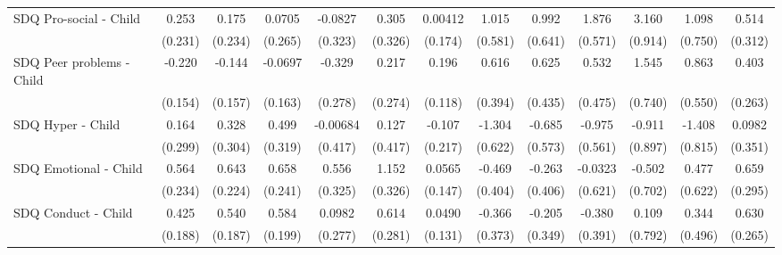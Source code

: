 {\begin{tabular}{l*{12}{c}}
\addlinespace
SDQ Pro-social - Child&       0.253         &       0.175         &      0.0705         &     -0.0827         &       0.305         &     0.00412         &       1.015         &       0.992         &       1.876\sym{**} &       3.160\sym{***}&       1.098         &       0.514         \\
            &     (0.231)         &     (0.234)         &     (0.265)         &     (0.323)         &     (0.326)         &     (0.174)         &     (0.581)         &     (0.641)         &     (0.571)         &     (0.914)         &     (0.750)         &     (0.312)         \\
\addlinespace
SDQ Peer problems - Child&      -0.220         &      -0.144         &     -0.0697         &      -0.329         &       0.217         &       0.196         &       0.616         &       0.625         &       0.532         &       1.545\sym{*}  &       0.863         &       0.403         \\
            &     (0.154)         &     (0.157)         &     (0.163)         &     (0.278)         &     (0.274)         &     (0.118)         &     (0.394)         &     (0.435)         &     (0.475)         &     (0.740)         &     (0.550)         &     (0.263)         \\
\addlinespace
SDQ Hyper - Child&       0.164         &       0.328         &       0.499         &    -0.00684         &       0.127         &      -0.107         &      -1.304\sym{*}  &      -0.685         &      -0.975         &      -0.911         &      -1.408         &      0.0982         \\
            &     (0.299)         &     (0.304)         &     (0.319)         &     (0.417)         &     (0.417)         &     (0.217)         &     (0.622)         &     (0.573)         &     (0.561)         &     (0.897)         &     (0.815)         &     (0.351)         \\
\addlinespace
SDQ Emotional - Child&       0.564\sym{*}  &       0.643\sym{**} &       0.658\sym{**} &       0.556         &       1.152\sym{***}&      0.0565         &      -0.469         &      -0.263         &     -0.0323         &      -0.502         &       0.477         &       0.659\sym{*}  \\
            &     (0.234)         &     (0.224)         &     (0.241)         &     (0.325)         &     (0.326)         &     (0.147)         &     (0.404)         &     (0.406)         &     (0.621)         &     (0.702)         &     (0.622)         &     (0.295)         \\
\addlinespace
SDQ Conduct - Child&       0.425\sym{*}  &       0.540\sym{**} &       0.584\sym{**} &      0.0982         &       0.614\sym{*}  &      0.0490         &      -0.366         &      -0.205         &      -0.380         &       0.109         &       0.344         &       0.630\sym{*}  \\
            &     (0.188)         &     (0.187)         &     (0.199)         &     (0.277)         &     (0.281)         &     (0.131)         &     (0.373)         &     (0.349)         &     (0.391)         &     (0.792)         &     (0.496)         &     (0.265)         \\
\bottomrule
\end{tabular}
}
